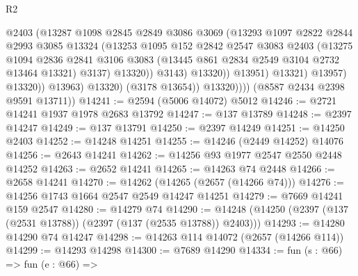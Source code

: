 \begin{lexlean}{R2}
\begin{coremodule}
                                  @2403
                                  (@13287
                                    @1098
                                    @2845
                                    @2849
                                    @3086
                                    @3069
                                    (@13293
                                      @1097
                                      @2822
                                      @2844
                                      @2993
                                      @3085
                                      @13324
                                      (@13253
                                        @1095
                                        @152
                                        @2842
                                        @2547
                                        @3083
                                        @2403
                                        (@13275
                                          @1094
                                          @2836
                                          @2841
                                          @3106
                                          @3083
                                          (@13445 @861 @2834 @2549 @3104 @2732 @13464 @13321)
                                          @3137)
                                        @13320))
                                    @3143)
                                  @13320))
                              @13951)
                            @13321)
                          @13957)
                        @13320))
                    @13963)
                  @13320)
                (@3178 @13654))
              @13320))))
      (@8587 @2434 @2398 @9591 @13711))
@14241 := @2594 (@5006 @14072) @5012
@14246 := @2721 @14241 @1937 @1978 @2683 @13792
@14247 := @137 @13789
@14248 := @2397 @14247
@14249 := @137 @13791
@14250 := @2397 @14249
@14251 := @14250 @2403
@14252 := @14248 @14251
@14255 := @14246 (@2449 @14252) @14076
@14256 := @2643 @14241
@14262 := @14256 @93 @1977 @2547 @2550 @2448 @14252
@14263 := @2652 @14241
@14265 := @14263 @74 @2448
@14266 := @2658 @14241
@14270 := @14262 (@14265 (@2657 (@14266 @74)))
@14276 := @14256 @1743 @1664 @2547 @2549 @14247 @14251
@14279 := @7669 @14241 @159 @2547
@14280 := @14279 @74
@14290 := @14248 (@14250 (@2397 (@137 (@2531 @13788)) (@2397 (@137 (@2535 @13788)) @2403)))
@14293 := @14280 @14290 @74 @14247
@14298 := @14263 @114 @14072 (@2657 (@14266 @114))
@14299 := @14293 @14298
@14300 := @7689 @14290
@14334 := fun (s : @66) =>
  fun (e : @66) =>

\end{coremodule}
\end{lexlean}

